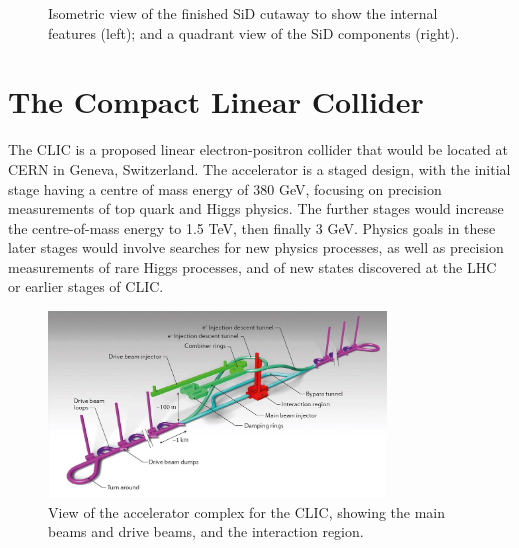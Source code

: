 \begin{figure}[p]%
	\centering
    \qquad
    \caption{Isometric view of the finished \acrshort{SiD} cutaway to show the internal features (left); and a quadrant view of the \acrshort{SiD} components (right).}%
    \label{figure:colliders/SiD/double}%
\end{figure}

\section{The Compact Linear Collider}
The \acrfull{CLIC} is a proposed linear electron-positron collider that would be located at \acrshort{CERN} in Geneva, Switzerland. The accelerator is a staged design, with the initial stage having a centre of mass energy of 380 GeV, focusing on precision measurements of top quark and Higgs physics. The further stages would increase the centre-of-mass energy to 1.5 TeV, then finally 3 GeV. Physics goals in these later stages would involve searches for new physics processes, as well as precision measurements of rare Higgs processes, and of new states discovered at the LHC or earlier stages of \acrshort{CLIC}. 

\begin{figure}[h]
	\centering
	\includegraphics[width=0.8\textwidth]{../Pictures/CLIC-Render.jpg}
	\caption{View of the accelerator complex for the \acrlong{CLIC}, showing the main beams and drive beams, and the interaction region.}
	\label{figure:colliders/CLIC/main}
\end{figure}


